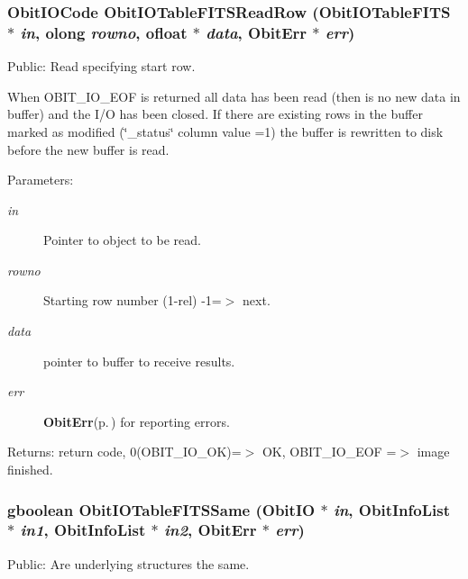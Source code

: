 \subsubsection{\setlength{\rightskip}{0pt plus 5cm}Obit\-IOCode Obit\-IOTable\-FITSRead\-Row ({\bf Obit\-IOTable\-FITS} $\ast$ {\em in}, {\bf olong} {\em rowno}, {\bf ofloat} $\ast$ {\em data}, {\bf Obit\-Err} $\ast$ {\em err})}\label{ObitIOTableFITS_8h_a13}


Public: Read specifying start row. 

When OBIT\_\-IO\_\-EOF is returned all data has been read (then is no new data in buffer) and the I/O has been closed. If there are existing rows in the buffer marked as modified (\char`\"{}\_\-status\char`\"{} column value =1) the buffer is rewritten to disk before the new buffer is read. \begin{Desc}
\item[Parameters:]
\begin{description}
\item[{\em in}]Pointer to object to be read. \item[{\em rowno}]Starting row number (1-rel) -1=$>$ next. \item[{\em data}]pointer to buffer to receive results. \item[{\em err}]{\bf Obit\-Err}{\rm (p.\,\pageref{structObitErr})} for reporting errors. \end{description}
\end{Desc}
\begin{Desc}
\item[Returns:]return code, 0(OBIT\_\-IO\_\-OK)=$>$ OK, OBIT\_\-IO\_\-EOF =$>$ image finished. \end{Desc}
\subsubsection{\setlength{\rightskip}{0pt plus 5cm}gboolean Obit\-IOTable\-FITSSame ({\bf Obit\-IO} $\ast$ {\em in}, {\bf Obit\-Info\-List} $\ast$ {\em in1}, {\bf Obit\-Info\-List} $\ast$ {\em in2}, {\bf Obit\-Err} $\ast$ {\em err})}\label{ObitIOTableFITS_8h_a6}


Public: Are underlying structures the same. 

